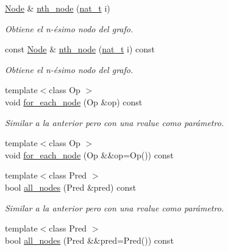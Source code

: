 \begin{DoxyCompactItemize}
\item 
\hyperlink{namespace_designar_a5af326c65aa2bd26b26c410f2030d09e}{Node} \& \hyperlink{class_designar_1_1_base_graph_ae4b7d560477f0b860d127a6ace6956e5}{nth\+\_\+node} (\hyperlink{namespace_designar_aa72662848b9f4815e7bf31a7cf3e33d1}{nat\+\_\+t} i)
\begin{DoxyCompactList}\small\item\em Obtiene el n-\/ésimo nodo del grafo. \end{DoxyCompactList}\item 
const \hyperlink{namespace_designar_a5af326c65aa2bd26b26c410f2030d09e}{Node} \& \hyperlink{class_designar_1_1_base_graph_adc03e916cb6246c9eeba181df82fd149}{nth\+\_\+node} (\hyperlink{namespace_designar_aa72662848b9f4815e7bf31a7cf3e33d1}{nat\+\_\+t} i) const
\begin{DoxyCompactList}\small\item\em Obtiene el n-\/ésimo nodo del grafo. \end{DoxyCompactList}\item 
{\footnotesize template$<$class Op $>$ }\\void \hyperlink{class_designar_1_1_base_graph_a9497531ac221edb5c5ef19888f78ad3c}{for\+\_\+each\+\_\+node} (Op \&op) const
\begin{DoxyCompactList}\small\item\em Similar a la anterior pero con una rvalue como parámetro. \end{DoxyCompactList}\item 
{\footnotesize template$<$class Op $>$ }\\void \hyperlink{class_designar_1_1_base_graph_aab8f765719514803f426b03939f519a1}{for\+\_\+each\+\_\+node} (Op \&\&op=Op()) const
\item 
{\footnotesize template$<$class Pred $>$ }\\bool \hyperlink{class_designar_1_1_base_graph_abad9513273c1096aba652e211180061c}{all\+\_\+nodes} (Pred \&pred) const
\begin{DoxyCompactList}\small\item\em Similar a la anterior pero con una rvalue como parámetro. \end{DoxyCompactList}\item 
{\footnotesize template$<$class Pred $>$ }\\bool \hyperlink{class_designar_1_1_base_graph_a32419ec17712a60c1964bc91e78d135c}{all\+\_\+nodes} (Pred \&\&pred=Pred()) const
\item 

\end{DoxyCompactItemize}
